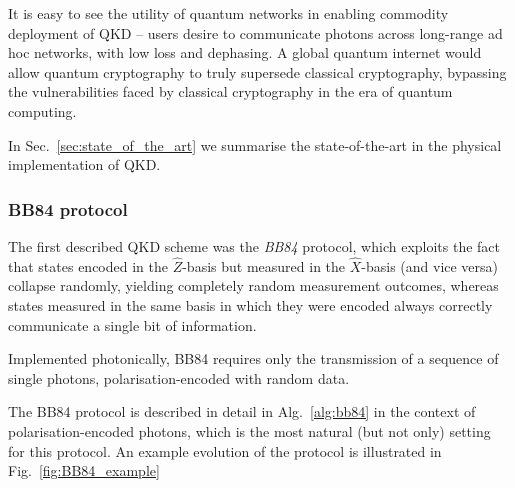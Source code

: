 It is easy to see the utility of quantum networks in enabling commodity deployment of QKD -- users desire to communicate photons across long-range ad hoc networks, with low loss and dephasing. A global quantum internet would allow quantum cryptography to truly supersede classical cryptography, bypassing the vulnerabilities faced by classical cryptography in the era of quantum computing.

In Sec.~\ref{sec:state_of_the_art} we summarise the state-of-the-art in the physical implementation of QKD.

%
%

\subsubsection{BB84 protocol}

The first described QKD scheme was the \textit{BB84} \cite{bib:BennetBrassard84} protocol, which exploits the fact that states encoded in the $\hat{Z}$-basis but measured in the $\hat{X}$-basis (and vice versa) collapse randomly, yielding completely random measurement outcomes, whereas states measured in the same basis in which they were encoded always correctly communicate a single bit of information.

Implemented photonically, BB84 requires only the transmission of a sequence of single photons, polarisation-encoded with random data.

The BB84 protocol is described in detail in Alg.~\ref{alg:bb84} in the context of polarisation-encoded photons, which is the most natural (but not only) setting for this protocol. An example evolution of the protocol is illustrated in Fig.~\ref{fig:BB84_example}

